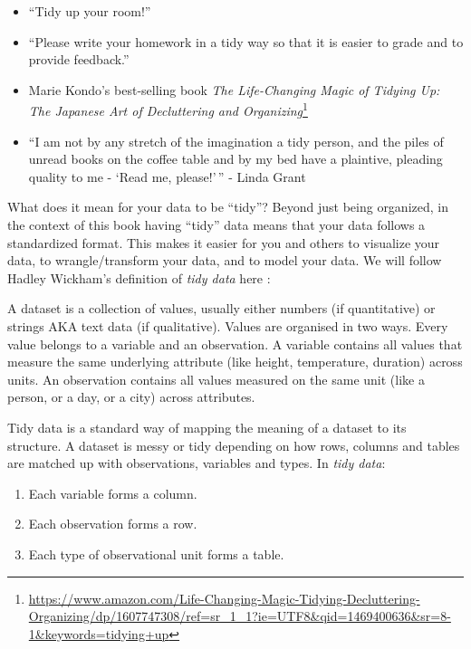\documentclass[12pt,]{krantz}
\providecommand{\tightlist}{%
  \setlength{\itemsep}{0pt}\setlength{\parskip}{0pt}}
\renewenvironment{quote}{\begin{VF}}{\end{VF}}
\renewcommand{\href}[2]{#2\footnote{\url{#1}}}
\begin{document}
\begin{itemize}
\tightlist
\item
  ``Tidy up your room!''
\item
  ``Please write your homework in a tidy way so that it is easier to
  grade and to provide feedback.''
\item
  Marie Kondo's best-selling book
  \href{https://www.amazon.com/Life-Changing-Magic-Tidying-Decluttering-Organizing/dp/1607747308/ref=sr_1_1?ie=UTF8\&qid=1469400636\&sr=8-1\&keywords=tidying+up}{\emph{The
  Life-Changing Magic of Tidying Up: The Japanese Art of Decluttering
  and Organizing}}
\item
  ``I am not by any stretch of the imagination a tidy person, and the
  piles of unread books on the coffee table and by my bed have a
  plaintive, pleading quality to me - `Read me, please!'\,'' - Linda
  Grant
\end{itemize}

What does it mean for your data to be ``tidy''? Beyond just being
organized, in the context of this book having ``tidy'' data means that
your data follows a standardized format. This makes it easier for you
and others to visualize your data, to wrangle/transform your data, and
to model your data. We will follow Hadley Wickham's definition of
\emph{tidy data} here \citep{tidy}:

\begin{quote}
A dataset is a collection of values, usually either numbers (if
quantitative) or strings AKA text data (if qualitative). Values are
organised in two ways. Every value belongs to a variable and an
observation. A variable contains all values that measure the same
underlying attribute (like height, temperature, duration) across units.
An observation contains all values measured on the same unit (like a
person, or a day, or a city) across attributes.
\end{quote}

\begin{quote}
Tidy data is a standard way of mapping the meaning of a dataset to its
structure. A dataset is messy or tidy depending on how rows, columns and
tables are matched up with observations, variables and types. In
\emph{tidy data}:
\end{quote}

\begin{quote}
\begin{enumerate}
\def\labelenumi{\arabic{enumi}.}
\tightlist
\item
  Each variable forms a column.
\item
  Each observation forms a row.
\item
  Each type of observational unit forms a table.
\end{enumerate}
\end{quote}
\end{document}
